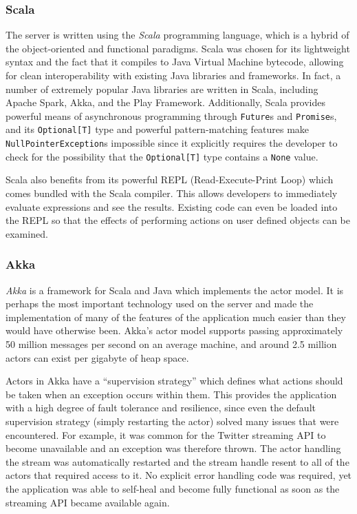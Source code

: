 \documentclass{l4proj}
\newcommand{\code}[1]{\texttt{#1}}
\begin{document}
        \subsubsection{Scala}
        The server is written using the \textit{Scala} programming language, which is a hybrid of the object-oriented and functional paradigms. Scala was chosen for its lightweight syntax and the fact that it compiles to Java Virtual Machine bytecode, allowing for clean interoperability with existing Java libraries and frameworks. In fact, a number of extremely popular Java libraries are written in Scala, including Apache Spark, Akka, and the Play Framework. Additionally, Scala provides powerful means of asynchronous programming through \code{Future}s and \code{Promise}s, and its \code{Optional[T]} type and powerful pattern-matching features make \code{NullPointerException}s impossible since it explicitly requires the developer to check for the possibility that the \code{Optional[T]} type contains a \code{None} value.
        
Scala also benefits from its powerful REPL (Read-Execute-Print Loop) which comes bundled with the Scala compiler. This allows developers to immediately evaluate expressions and see the results. Existing code can even be loaded into the REPL so that the effects of performing actions on user defined objects can be examined.
        
        \subsubsection{Akka}
        \textit{Akka} is a framework for Scala and Java which implements the actor model. It is perhaps the most important technology used on the server and made the implementation of many of the features of the application much easier than they would have otherwise been. Akka's actor model supports passing approximately 50 million messages per second on an average machine, and around 2.5 million actors can exist per gigabyte of heap space.
        
        Actors in Akka have a “supervision strategy” which defines what actions should be taken when an exception occurs within them. This provides the application with a high degree of fault tolerance and resilience, since even the default supervision strategy (simply restarting the actor) solved many issues that were encountered. For example, it was common for the Twitter streaming API to become unavailable and an exception was therefore thrown. The actor handling the stream was automatically restarted and the stream handle resent to all of the actors that required access to it. No explicit error handling code was required, yet the application was able to self-heal and become fully functional as soon as the streaming API became available again.
        
\end{document}
